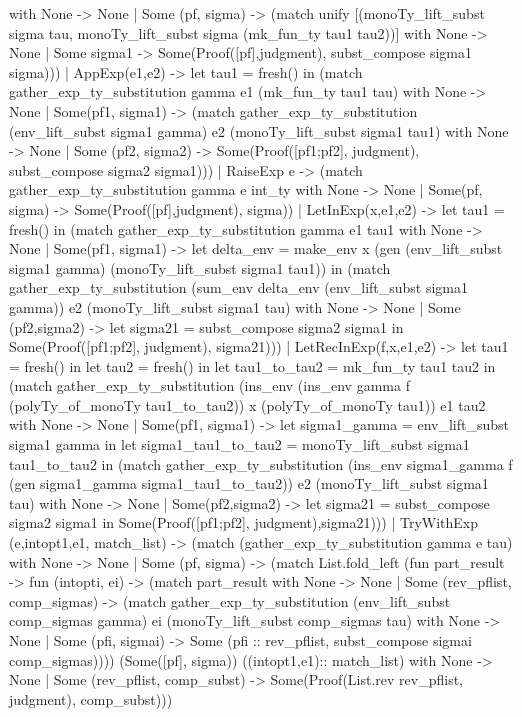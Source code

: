        with None -> None
       | Some (pf, sigma) ->
         (match unify [(monoTy_lift_subst sigma tau,
                        monoTy_lift_subst sigma (mk_fun_ty tau1 tau2))]
          with None -> None
          | Some sigma1 ->
            Some(Proof([pf],judgment), subst_compose sigma1 sigma)))
    | AppExp(e1,e2) ->
      let tau1 = fresh() in
      (match gather_exp_ty_substitution gamma e1 (mk_fun_ty tau1 tau)
       with None -> None
       | Some(pf1, sigma1) ->
         (match gather_exp_ty_substitution (env_lift_subst sigma1 gamma) e2
                                           (monoTy_lift_subst sigma1 tau1)
          with None -> None
          | Some (pf2, sigma2) ->
            Some(Proof([pf1;pf2], judgment), subst_compose sigma2 sigma1)))
    | RaiseExp e ->
      (match gather_exp_ty_substitution gamma e int_ty
       with None -> None
       | Some(pf, sigma) -> Some(Proof([pf],judgment), sigma))
    | LetInExp(x,e1,e2)  -> 
       let tau1 = fresh() in
       (match gather_exp_ty_substitution gamma e1 tau1
	with None -> None
	   | Some(pf1, sigma1) -> 
	      let delta_env = make_env x (gen (env_lift_subst sigma1 gamma) 
					      (monoTy_lift_subst sigma1 tau1)) in
	      (match gather_exp_ty_substitution 
		       (sum_env delta_env (env_lift_subst sigma1 gamma)) e2
                         (monoTy_lift_subst sigma1 tau)
	       with None -> None
		  | Some (pf2,sigma2) ->
		     let sigma21 = subst_compose sigma2 sigma1 in
		     Some(Proof([pf1;pf2], judgment), sigma21)))
    | LetRecInExp(f,x,e1,e2) ->
       let tau1  = fresh() in
       let tau2 = fresh() in
       let tau1_to_tau2 = mk_fun_ty tau1 tau2 in
       (match gather_exp_ty_substitution
		(ins_env (ins_env gamma f (polyTy_of_monoTy tau1_to_tau2))
			  x (polyTy_of_monoTy tau1))
		e1 tau2
	with None -> None
	   | Some(pf1, sigma1) -> 
              let sigma1_gamma = env_lift_subst sigma1 gamma in
	      let sigma1_tau1_to_tau2 = monoTy_lift_subst sigma1 tau1_to_tau2 in
	      (match gather_exp_ty_substitution
                     (ins_env sigma1_gamma f (gen sigma1_gamma sigma1_tau1_to_tau2))
		     e2 (monoTy_lift_subst sigma1 tau)
	       with None -> None
		  | Some(pf2,sigma2) ->
		     let sigma21 = subst_compose sigma2 sigma1 in
		     Some(Proof([pf1;pf2], judgment),sigma21)))
    | TryWithExp (e,intopt1,e1, match_list) ->
      (match (gather_exp_ty_substitution gamma e tau)
       with None -> None
       | Some (pf, sigma) ->
         (match
           List.fold_left
           (fun part_result -> fun (intopti, ei) ->
            (match part_result with None -> None
             | Some (rev_pflist, comp_sigmas) ->
               (match gather_exp_ty_substitution
                      (env_lift_subst comp_sigmas gamma) ei
                      (monoTy_lift_subst comp_sigmas tau)
                with None -> None
                | Some (pfi, sigmai) ->
                  Some (pfi :: rev_pflist, subst_compose sigmai comp_sigmas))))
           (Some([pf], sigma))
           ((intopt1,e1):: match_list)
           with None -> None
           | Some (rev_pflist, comp_subst) ->
             Some(Proof(List.rev rev_pflist, judgment), comp_subst)))


